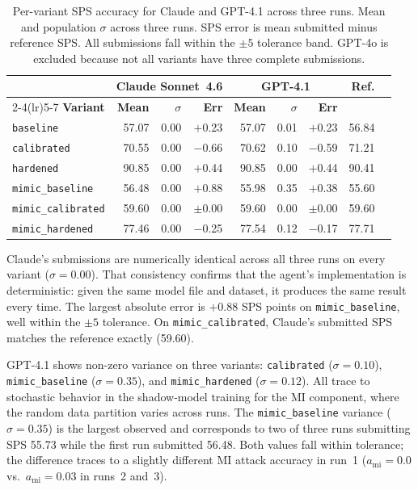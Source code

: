 \documentclass[11pt]{article}
\begin{document}
\begin{table}[t]
\caption{Per-variant SPS accuracy for Claude and GPT-4.1 across three runs.
Mean and population $\sigma$ across three runs. SPS error is mean submitted
minus reference SPS. All submissions fall within the $\pm 5$ tolerance band.
GPT-4o is excluded because not all variants have three complete submissions.}
\label{tab:pervariant}
\vskip 0.1in
\centering
\small
\begin{tabular}{@{}lrrrrrrrr@{}}
\toprule
& \multicolumn{3}{c}{\textbf{Claude Sonnet~4.6}}
& \multicolumn{3}{c}{\textbf{GPT-4.1}}
& \multirow{2}{*}{\textbf{Ref.}} \\
\cmidrule(lr){2-4}\cmidrule(lr){5-7}
\textbf{Variant}
  & \textbf{Mean} & $\sigma$ & \textbf{Err}
  & \textbf{Mean} & $\sigma$ & \textbf{Err}
  & \\
\midrule
\texttt{baseline}          & 57.07 & 0.00 & $+$0.23 & 57.07 & 0.01 & $+$0.23 & 56.84 \\
\texttt{calibrated}        & 70.55 & 0.00 & $-$0.66 & 70.62 & 0.10 & $-$0.59 & 71.21 \\
\texttt{hardened}          & 90.85 & 0.00 & $+$0.44 & 90.85 & 0.00 & $+$0.44 & 90.41 \\
\texttt{mimic\_baseline}   & 56.48 & 0.00 & $+$0.88 & 55.98 & 0.35 & $+$0.38 & 55.60 \\
\texttt{mimic\_calibrated} & 59.60 & 0.00 & $\pm$0.00 & 59.60 & 0.00 & $\pm$0.00 & 59.60 \\
\texttt{mimic\_hardened}   & 77.46 & 0.00 & $-$0.25 & 77.54 & 0.12 & $-$0.17 & 77.71 \\
\bottomrule
\end{tabular}
\end{table}

Claude's submissions are numerically identical across all three runs on every
variant ($\sigma = 0.00$). That consistency confirms that the agent's
implementation is deterministic: given the same model file and dataset, it
produces the same result every time. The largest absolute error is $+0.88$ SPS
points on \texttt{mimic\_baseline}, well within the $\pm 5$ tolerance. On
\texttt{mimic\_calibrated}, Claude's submitted SPS matches the reference
exactly (59.60).

GPT-4.1 shows non-zero variance on three variants: \texttt{calibrated}
($\sigma = 0.10$), \texttt{mimic\_baseline} ($\sigma = 0.35$), and
\texttt{mimic\_hardened} ($\sigma = 0.12$). All trace to stochastic behavior
in the shadow-model training for the MI component, where the random data
partition varies across runs. The \texttt{mimic\_baseline} variance
($\sigma = 0.35$) is the largest observed and corresponds to two of three
runs submitting SPS 55.73 while the first run submitted 56.48. Both values
fall within tolerance; the difference traces to a slightly different MI
attack accuracy in run~1 ($a_{\text{mi}} = 0.0$ vs.\ $a_{\text{mi}} = 0.03$
in runs~2 and~3).
\end{document}

